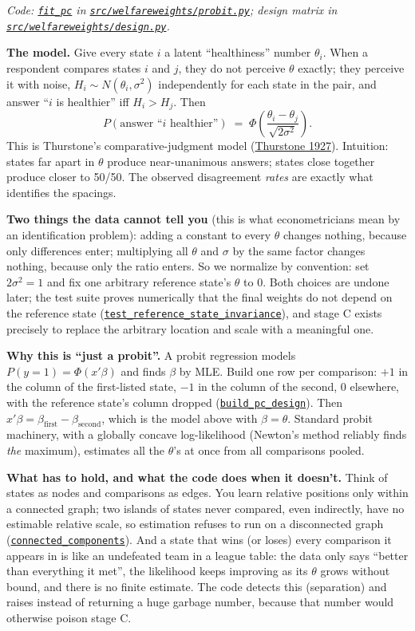 \documentclass[11pt]{article}
\newcommand{\repo}{https://github.com/welfareweights/engine}
\newcommand{\src}[1]{\href{\repo/blob/main/#1}{\texttt{#1}}}
\newcommand{\fn}[1]{\href{https://github.com/search?q=repo\%3Awelfareweights\%2Fengine+symbol\%3A#1\&type=code}{\texttt{#1}}}
\begin{document}
\emph{Code: \fn{fit\_pc} in \src{src/welfareweights/probit.py}; design matrix in \src{src/welfareweights/design.py}.}

\textbf{The model.} Give every state $i$ a latent ``healthiness'' number $\theta_i$. When a respondent compares states $i$ and $j$, they do not perceive $\theta$ exactly; they perceive it with noise, $H_i \sim N(\theta_i, \sigma^2)$ independently for each state in the pair, and answer ``$i$ is healthier'' iff $H_i > H_j$. Then
\begin{equation}
P(\text{answer ``}i\text{ healthier''}) \;=\; \Phi\!\left(\frac{\theta_i - \theta_j}{\sqrt{2\sigma^2}}\right).
\end{equation}
This is Thurstone's comparative-judgment model (\href{https://doi.org/10.1037/h0070288}{Thurstone 1927}). Intuition: states far apart in $\theta$ produce near-unanimous answers; states close together produce closer to 50/50. The observed disagreement \emph{rates} are exactly what identifies the spacings.

\textbf{Two things the data cannot tell you} (this is what econometricians mean by an identification problem): adding a constant to every $\theta$ changes nothing, because only differences enter; multiplying all $\theta$ and $\sigma$ by the same factor changes nothing, because only the ratio enters. So we normalize by convention: set $2\sigma^2 = 1$ and fix one arbitrary reference state's $\theta$ to 0. Both choices are undone later; the test suite proves numerically that the final weights do not depend on the reference state (\fn{test\_reference\_state\_invariance}), and stage C exists precisely to replace the arbitrary location and scale with a meaningful one.

\textbf{Why this is ``just a probit''.} A probit regression models $P(y=1)=\Phi(x'\beta)$ and finds $\beta$ by MLE. Build one row per comparison: $+1$ in the column of the first-listed state, $-1$ in the column of the second, 0 elsewhere, with the reference state's column dropped (\fn{build\_pc\_design}). Then $x'\beta = \beta_{\text{first}} - \beta_{\text{second}}$, which is the model above with $\beta=\theta$. Standard probit machinery, with a globally concave log-likelihood (Newton's method reliably finds \emph{the} maximum), estimates all the $\theta$'s at once from all comparisons pooled.

\textbf{What has to hold, and what the code does when it doesn't.} Think of states as nodes and comparisons as edges. You learn relative positions only within a connected graph; two islands of states never compared, even indirectly, have no estimable relative scale, so estimation refuses to run on a disconnected graph (\fn{connected\_components}). And a state that wins (or loses) every comparison it appears in is like an undefeated team in a league table: the data only says ``better than everything it met'', the likelihood keeps improving as its $\theta$ grows without bound, and there is no finite estimate. The code detects this (separation) and raises instead of returning a huge garbage number, because that number would otherwise poison stage C.
\end{document}
